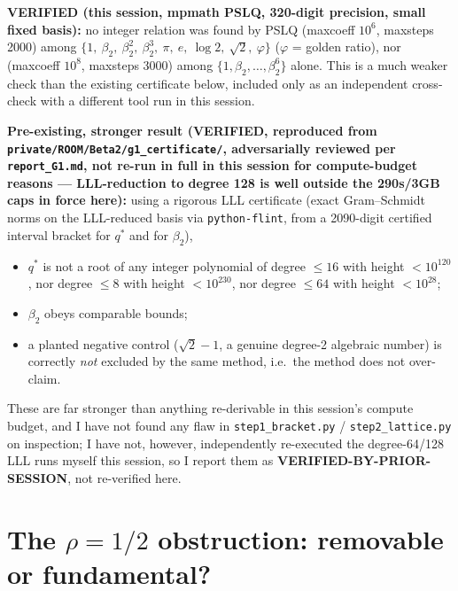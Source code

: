 \documentclass[11pt]{article}
\begin{document}
\textbf{VERIFIED (this session, mpmath PSLQ, 320-digit precision, small fixed basis):} no
integer relation was found by PSLQ (maxcoeff $10^6$, maxsteps 2000) among
$\{1,\ \beta_2,\ \beta_2^2,\ \beta_2^3,\ \pi,\ e,\ \log 2,\ \sqrt2,\ \varphi\}$ ($\varphi$ = golden
ratio), nor (maxcoeff $10^8$, maxsteps 3000) among $\{1,\beta_2,\ldots,\beta_2^6\}$ alone. This
is a much weaker check than the existing certificate below, included only as an independent
cross-check with a different tool run in this session.

\textbf{Pre-existing, stronger result (VERIFIED, reproduced from
\texttt{private/ROOM/Beta2/g1\_certificate/}, adversarially reviewed per
\texttt{report\_G1.md}, not re-run in full in this session for compute-budget reasons ---
LLL-reduction to degree 128 is well outside the 290s/3GB caps in force here):} using a
rigorous LLL certificate (exact Gram--Schmidt norms on the LLL-reduced basis via
\texttt{python-flint}, from a 2090-digit certified interval bracket for $q^\ast$ and for
$\beta_2$),
\begin{itemize}
\item $q^\ast$ is not a root of any integer polynomial of degree $\le 16$ with height
$<10^{120}$, nor degree $\le 8$ with height $<10^{230}$, nor degree $\le 64$ with height
$<10^{28}$;
\item $\beta_2$ obeys comparable bounds;
\item a planted negative control ($\sqrt2-1$, a genuine degree-2 algebraic number) is
correctly \emph{not} excluded by the same method, i.e.\ the method does not over-claim.
\end{itemize}
These are far stronger than anything re-derivable in this session's compute budget, and I have
not found any flaw in \texttt{step1\_bracket.py} / \texttt{step2\_lattice.py} on inspection; I
have not, however, independently re-executed the degree-64/128 LLL runs myself this session, so
I report them as \textbf{VERIFIED-BY-PRIOR-SESSION}, not re-verified here.

\section{The $\rho=1/2$ obstruction: removable or fundamental?}
\end{document}
